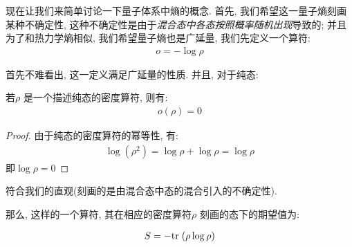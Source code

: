 现在让我们来简单讨论一下量子体系中熵的概念. 首先, 我们希望这一量子熵刻画某种不确定性,
这种不确定性是由于\emph{混合态中各态按照概率随机出现}导致的; 并且为了和热力学熵相似,
我们希望量子熵也是广延量, 我们先定义一个算符:
\begin{equation}
  \begin{aligned}
    o = -\log \rho
  \end{aligned}
\end{equation}

首先不难看出, 这一定义满足广延量的性质. 并且, 对于纯态:

\begin{theorem}
若$\rho$ 是一个描述纯态的密度算符, 则有:  
\begin{equation}
  \begin{aligned}
    o(\rho) = 0
  \end{aligned}
\end{equation}
\end{theorem}
\begin{proof}
  由于纯态的密度算符的幂等性, 有:
  \begin{equation}
    \begin{aligned}
      \log(\rho^{2}) = \log \rho + \log \rho = \log \rho
    \end{aligned}
  \end{equation}
  即$\log \rho=0$
\end{proof}

符合我们的直观(刻画的是由混合态中态的混合引入的不确定性).

那么, 这样的一个算符, 其在相应的密度算符$\rho$ 刻画的态下的期望值为:

\begin{equation}
  \begin{aligned}
    S = -{\rm tr}\; (\rho \log \rho)
  \end{aligned}
\end{equation}

